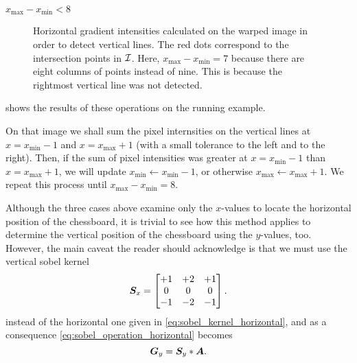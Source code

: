 \documentclass[../main.tex]{subfiles}
\begin{document}
\begin{caselist}
\begin{case}{$x_\text{max}-x_\text{min}<8$}
\begin{figure}
            \caption[Horizontal gradient intensities calculated on the warped image in order to detect vertical lines.]{Horizontal gradient intensities calculated on the warped image in order to detect vertical lines. The red dots correspond to the intersection points in ${\mathcal{I}}$. Here, $x_\text{max}-x_\text{min}=7$ because there are eight columns of points instead of nine. This is because the rightmost vertical line was not detected.}
            \label{fig:warped_image_gradients}
        \end{figure}
         shows the results of these operations on the running example.

        On that image we shall sum the pixel internsities on the vertical lines at $x=x_\text{min}-1$ and $x=x_\text{max}+1$ (with a small tolerance to the left and to the right).
        Then, if the sum of pixel intensities was greater at $x=x_\text{min}-1$ than $x=x_\text{max}+1$, we will update $x_\text{min} \gets x_\text{min}-1$, or otherwise $x_\text{max} \gets x_\text{max}+1$.
        We repeat this process until $x_\text{max}-x_\text{min}=8$.
    \end{case}
\end{caselist}

Although the three cases above examine only the $x$-values to locate the horizontal position of the chessboard, it is trivial to see how this method applies to determine the vertical position of the chessboard using the $y$-values, too.
However, the main caveat the reader should acknowledge is that we must use the vertical sobel kernel
\begin{equation}
    {\bm{S}}_x = \begin{bmatrix}
        +1 & +2 & +1\\
        0 & 0 & 0\\
        -1 & -2 & -1\\
    \end{bmatrix}.
\end{equation}
instead of the horizontal one given in \cref{eq:sobel_kernel_horizontal}, and as a consequence \cref{eq:sobel_operation_horizontal} becomes
\begin{equation}
    {\bm{G}}_y = {\bm{S}}_y * {\bm{A}}.
\end{equation}
\end{document}

